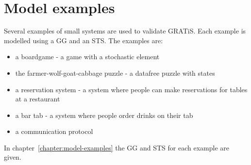 \section{Model examples}\label{sec:model-examples}

Several examples of small systems are used to validate GRATiS. Each example is modelled using a GG and an STS. The examples are:
\begin{itemize}
\item a boardgame - a game with a stochastic element
\item the farmer-wolf-goat-cabbage puzzle - a datafree puzzle with states
\item a reservation system - a system where people can make reservations for tables at a restaurant
\item a bar tab - a system where people order drinks on their tab
\item a communication protocol
\end{itemize}

In chapter~\ref{chapter:model-examples} the GG and STS for each example are given.
